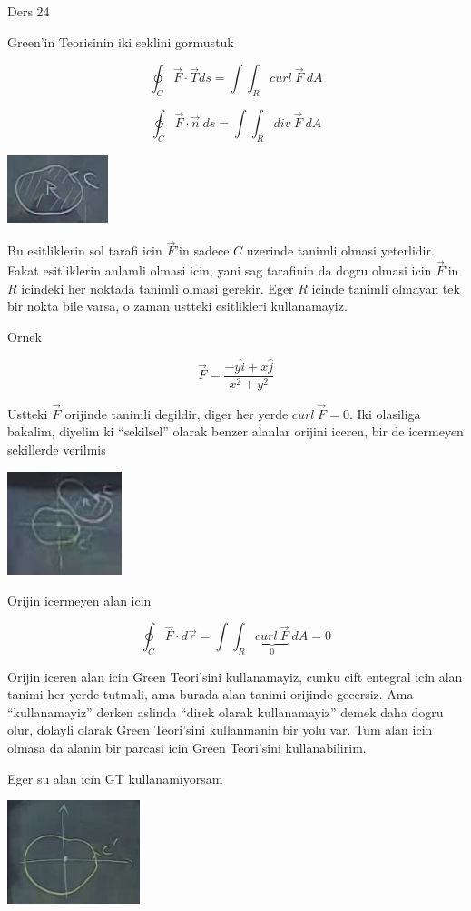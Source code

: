 \documentclass[12pt,fleqn]{article}\usepackage{../common}
\begin{document}
Ders 24

Green'in Teorisinin iki seklini gormustuk

\[ \oint_C \vec{F} \cdot \vec{T} ds = \int \int_R curl \ \vec{F} \ dA \]

\[ \oint_C \vec{F} \cdot \vec{n} \ ds = \int \int_R div \ \vec{F} \ dA \]


\includegraphics[height=2cm]{24_1.png}

Bu esitliklerin sol tarafi icin $\vec{F}$'in sadece $C$ uzerinde tanimli
olmasi yeterlidir. Fakat esitliklerin anlamli olmasi icin, yani sag
tarafinin da dogru olmasi icin $\vec{F}$'in $R$ icindeki her noktada tanimli
olmasi gerekir. Eger $R$ icinde tanimli olmayan tek bir nokta bile varsa, o
zaman ustteki esitlikleri kullanamayiz.

Ornek 

\[ \vec{F} = \frac{ -y\hat{i} + x\hat{j}}{x^2+y^2} \]

Ustteki $\vec{F}$ orijinde tanimli degildir, diger her yerde $curl \
\vec{F} = 0$. 
Iki olasiliga bakalim, diyelim ki ``sekilsel'' olarak benzer alanlar orijini
iceren, bir de icermeyen sekillerde verilmis

\includegraphics[height=3cm]{24_2.png}

Orijin icermeyen alan icin

\[ \oint_C \vec{F} \cdot d\vec{r} = 
\int \int_R \underbrace{curl \ \vec{F}}_{0} \ dA  = 0
\]
 
Orijin iceren alan icin Green Teori'sini kullanamayiz, cunku cift entegral
icin alan tanimi her yerde tutmali, ama burada alan tanimi orijinde
gecersiz. Ama ``kullanamayiz'' derken aslinda ``direk olarak kullanamayiz''
demek daha dogru olur, dolayli olarak Green Teori'sini kullanmanin bir yolu
var. Tum alan icin olmasa da alanin bir parcasi icin Green Teori'sini
kullanabilirim. 

Eger su alan icin GT kullanamiyorsam

\includegraphics[height=3cm]{24_3.png}
\end{document}
